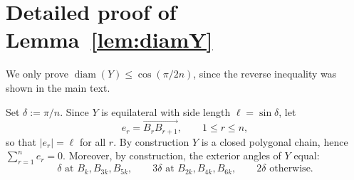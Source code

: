 \documentclass{article}
\DeclareMathOperator{\diam}{diam}
\theoremstyle{definition}
\let\le\leqslant
\newcounter{row}
\begin{document}
\section{Detailed proof of Lemma~\ref{lem:diamY}}\label{app:diamY}


We only prove $\diam(Y)\le \cos(\pi/2n)$, since the reverse inequality was shown in the main text.




Set $\delta:=\pi/n$.
Since $Y$ is equilateral with side length $\ell=\sin\delta$, let
\[
e_r = \overrightarrow{B_r B_{r+1}}, \qquad 1\le r\le n,
\]
so that $|e_r|=\ell$ for all $r$. By construction $Y$ is a closed polygonal chain, hence $\sum_{r=1}^n e_r=0$. Moreover, by construction, the exterior angles of $Y$ equal:
\[
\delta \text{ at } B_k,B_{3k},B_{5k},\qquad
3\delta \text{ at } B_{2k},B_{4k},B_{6k},\qquad
2\delta \text{ otherwise}.
\]
\end{document}
